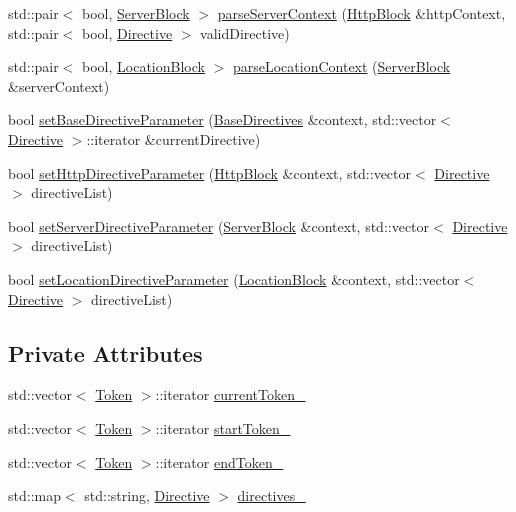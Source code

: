 \begin{DoxyCompactItemize}
\item 
std\+::pair$<$ bool, \hyperlink{classft_1_1_server_block}{Server\+Block} $>$ \hyperlink{classft_1_1_parser_ae53bb700e0344f7af2519a5af3ae4230}{parse\+Server\+Context} (\hyperlink{classft_1_1_http_block}{Http\+Block} \&http\+Context, std\+::pair$<$ bool, \hyperlink{classft_1_1_directive}{Directive} $>$ valid\+Directive)
\item 
std\+::pair$<$ bool, \hyperlink{classft_1_1_location_block}{Location\+Block} $>$ \hyperlink{classft_1_1_parser_a87f0f31d2bc2e6357d522e70256878ca}{parse\+Location\+Context} (\hyperlink{classft_1_1_server_block}{Server\+Block} \&server\+Context)
\item 
bool \hyperlink{classft_1_1_parser_a9f412d172694519d0d8dd9edacd257c0}{set\+Base\+Directive\+Parameter} (\hyperlink{classft_1_1_base_directives}{Base\+Directives} \&context, std\+::vector$<$ \hyperlink{classft_1_1_directive}{Directive} $>$\+::iterator \&current\+Directive)
\item 
bool \hyperlink{classft_1_1_parser_a5d287909e4c513e20b017ba0699b0cbf}{set\+Http\+Directive\+Parameter} (\hyperlink{classft_1_1_http_block}{Http\+Block} \&context, std\+::vector$<$ \hyperlink{classft_1_1_directive}{Directive} $>$ directive\+List)
\item 
bool \hyperlink{classft_1_1_parser_a18c1b12280ce1a16246a8ba09156116f}{set\+Server\+Directive\+Parameter} (\hyperlink{classft_1_1_server_block}{Server\+Block} \&context, std\+::vector$<$ \hyperlink{classft_1_1_directive}{Directive} $>$ directive\+List)
\item 
bool \hyperlink{classft_1_1_parser_a82bee2278db1afa69bbb6eb6f192743c}{set\+Location\+Directive\+Parameter} (\hyperlink{classft_1_1_location_block}{Location\+Block} \&context, std\+::vector$<$ \hyperlink{classft_1_1_directive}{Directive} $>$ directive\+List)
\end{DoxyCompactItemize}
\subsection*{Private Attributes}
\begin{DoxyCompactItemize}
\item 
std\+::vector$<$ \hyperlink{classft_1_1_token}{Token} $>$\+::iterator \hyperlink{classft_1_1_parser_a942c5b794d108f144c5b5028aaa34cb6}{current\+Token\+\_\+}
\item 
std\+::vector$<$ \hyperlink{classft_1_1_token}{Token} $>$\+::iterator \hyperlink{classft_1_1_parser_a85bbb595991c68a1ec2751fabcb8eae5}{start\+Token\+\_\+}
\item 
std\+::vector$<$ \hyperlink{classft_1_1_token}{Token} $>$\+::iterator \hyperlink{classft_1_1_parser_a538ba3ab8ee1d0cef5cc3c999f3ab44c}{end\+Token\+\_\+}
\item 
std\+::map$<$ std\+::string, \hyperlink{classft_1_1_directive}{Directive} $>$ \hyperlink{classft_1_1_parser_abe21d1e60d970dd268181e79250b5399}{directives\+\_\+}
\end{DoxyCompactItemize}


